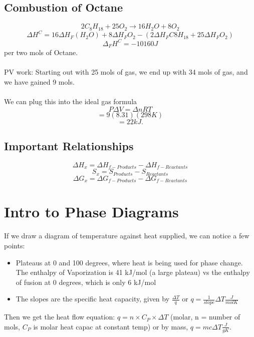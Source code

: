 \documentclass[10pt, twocolumn]{report}
\begin{document}
     \subsection{Combustion of Octane}
     $$2C_8H_{18} + 25O_2 \rightarrow 16H_2O + 8 O_2$$
     $$\Delta H^C = 16 \Delta H_F (H_2O) + 8 \Delta H_F O_2 - (2\Delta H_F C8H_{18} + 25\Delta H_F O_2)$$
     $$\Delta_F H^C = -10160 J $$ per two mols of Octane.\\\\ PV work: Starting out with 25 mols of gas, we end up with 34 mols of gas, and we have gained 9 mols. \\\\ We can plug this into the ideal gas formula $$P\Delta V = \Delta n R T$$ $$ = 9 (8.31)(298K)$$ $$=22 kJ. $$
     \subsection{Important Relationships}
	$$\Delta H_x = \Delta H_{f-Products} - \Delta H_{f-Reactants}$$
	$$ S_x = S_{Products} - S_{Reactants}$$
	$$\Delta G_x = \Delta G_{f - Products} - \Delta G_{f - Reactants}$$
    \section{Intro to Phase Diagrams}
    If we draw a diagram of temperature against heat supplied, we can notice a few points:
    \begin{itemize}
        \item Plateaus at 0 and 100 degrees, where heat is being used for phase change. The enthalpy of Vaporization is 41 kJ/mol (a large plateau) vs the enthalpy of fusion at 0 degrees, which is only 6 kJ/mol
        \item The slopes are the specific heat capacity, given by $\frac{\Delta T}{q}$ or $q = \frac{1}{slope}\Delta T \frac{J}{mol K}$
    \end{itemize}
    Then we get the heat flow equation: $q = n\times C_P\times \Delta T$ (molar, n = number of mols, $C_P$ is molar heat capac at constant temp) or by mass, $q = mc\Delta T \frac{J}{gK}$.


\end{document}

